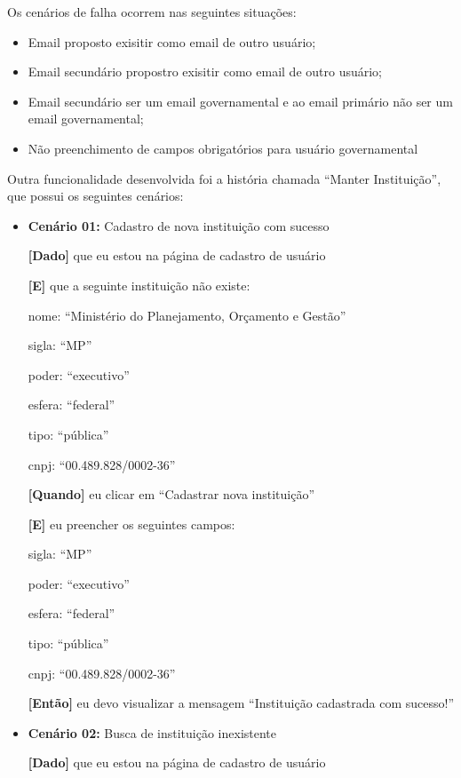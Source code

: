	Os cenários de falha ocorrem nas seguintes situações:
	\begin{itemize}
	\item Email proposto exisitir como email de outro usuário;
	\item Email secundário propostro exisitir como email de outro usuário;
	\item Email secundário ser um email governamental e ao email primário não ser um email governamental;
	\item Não preenchimento de campos obrigatórios para usuário governamental 
	\end{itemize}


Outra funcionalidade desenvolvida foi a história chamada ``Manter Instituição'', que possui os seguintes cenários:
\begin{itemize}
\item\textbf{Cenário 01:} Cadastro de nova instituição com sucesso

\textbf{[Dado]} que eu estou na página de cadastro de usuário

\textbf{[E]} que a seguinte instituição não existe:

  	\subitem nome: ``Ministério do Planejamento, Orçamento e Gestão''

  	\subitem sigla: ``MP''

 	\subitem poder: ``executivo''

 	\subitem esfera: ``federal''

  	\subitem tipo: ``pública''

  	\subitem cnpj: ``00.489.828/0002-36''

\textbf{[Quando]} eu clicar em ``Cadastrar nova instituição''

\textbf{[E]} eu preencher os seguintes campos:

  	\subitem sigla: ``MP''

  	\subitem poder: ``executivo''

  	\subitem esfera: ``federal''

  	\subitem tipo: ``pública''

  	\subitem cnpj: ``00.489.828/0002-36''

\textbf{[Então]} eu devo visualizar a mensagem ``Instituição cadastrada com sucesso!''

\item\textbf{Cenário 02:} Busca de instituição inexistente

\textbf{[Dado]} que eu estou na página de cadastro de usuário


\end{itemize}
